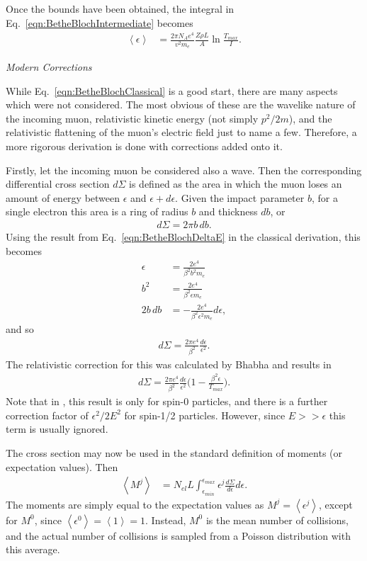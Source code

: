 Once the bounds have been obtained, the integral in Eq.~\eqref{eqn:BetheBlochIntermediate} becomes
\begin{align}
\left<\epsilon\right> &= \frac{2\pi N_A e^4}{v^2 m_e} \frac{Z\rho L}{A} \ln{\frac{T_{max}}{I}} \label{eqn:BetheBlochClassical}.
\end{align}

\noindent \textit{\large{Modern Corrections}}

\iffalse
While Eq.~\eqref{eqn:BetheBlochClassical} is a good start, there are many aspects which were not considered. The most obvious of these are the wavelike nature of the incoming muon, relativistic kinetic energy (not simply $p^2/2m$), and the relativistic flattening of the muon's electric field just to name a few. Therefore, a more rigorous derivation is done with corrections added onto it.

Firstly, let the incoming muon be considered also a wave. Then the corresponding differential cross section $d\Sigma$ is defined as the area in which the muon loses an amount of energy between $\epsilon$ and $\epsilon+d\epsilon$. Given the impact parameter $b$, for a single electron this area is a ring of radius $b$ and thickness $db$, or \cite{bichsel1968,bichsel1988}
\begin{align*}
d\Sigma=2\pi b \, db.
\end{align*}
Using the result from Eq.~\eqref{eqn:BetheBlochDeltaE} in the classical derivation, this becomes
\begin{align*}
\epsilon &= \frac{2e^4}{\beta^2 b^2 m_e}\\
b^2 &= \frac{2e^4}{\beta^2 \epsilon m_e}\\
2b \, db &= -\frac{2e^4}{\beta^2 \epsilon^2 m_e}d\epsilon,
\end{align*}
and so
\begin{align*}
d\Sigma=\frac{2\pi e^4}{\beta^2} \frac{d\epsilon}{\epsilon ^2}.
\end{align*}
The relativistic correction for this was calculated by Bhabha \cite{uehling,bhabha} and results in
\begin{align*}
d\Sigma=\frac{2\pi e^4}{\beta^2} \frac{d\epsilon}{\epsilon ^2}\Big(1-\frac{\beta^2 \epsilon}{T_{max}}\Big).
\end{align*}
Note that in \cite{uehling}, this result is only for spin-0 particles, and there is a further correction factor of $\epsilon ^2 / 2E^2$ for spin-1/2 particles. However, since $E>>\epsilon$ this term is usually ignored.

The cross section may now be used in the standard definition of moments (or expectation values). Then
\begin{align} \label{eqn:StragglingMoments}
\left< M^j\right>&=N_{el} L \int_{\epsilon_{min}} ^{\epsilon_{max}} \epsilon^j \frac{d\Sigma}{d\epsilon} d\epsilon .
\end{align}
The moments are simply equal to the expectation values as $M^j=\left<\epsilon ^j \right>$, except for $M^0$, since $\left< \epsilon ^0 \right>=\left< 1 \right> = 1$. Instead, $M^0$ is the mean number of collisions, and the actual number of collisions is sampled from a Poisson distribution with this average.

